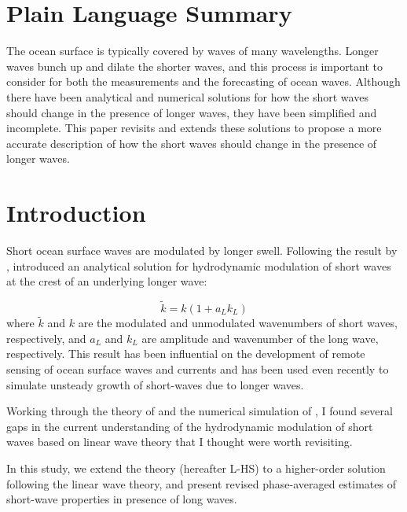 \documentclass[draft]{agujournal2019}
\begin{document}
\section*{Plain Language Summary}
The ocean surface is typically covered by waves of many wavelengths.
Longer waves bunch up and dilate the shorter waves, and this process is
important to consider for both the measurements and the forecasting of ocean
waves.
Although there have been analytical and numerical solutions for how the short
waves should change in the presence of longer waves, they have been simplified
and incomplete.
This paper revisits and extends these solutions to propose a more accurate
description of how the short waves should change in the presence of longer
waves.

\section{Introduction}

Short ocean surface waves are modulated by longer swell.
Following the result by ,
 introduced an analytical solution for hydrodynamic
modulation of short waves at the crest of an underlying longer wave:

\begin{equation}
\label{eq:tau}
\widetilde{k} = k (1 + a_L k_L)
\end{equation}
where $\widetilde{k}$ and $k$ are the modulated and unmodulated wavenumbers of
short waves, respectively, and $a_L$ and $k_L$ are amplitude and wavenumber
of the long wave, respectively.
This result has been influential on the development of remote sensing of ocean
surface waves and currents \cite{keller1975microwave,hara1994hydrodynamic}
and has been used even recently \cite{peureux2021unsteady} to simulate
unsteady growth of short-waves due to longer waves.

Working through the theory of 
and the numerical simulation of , I found several
gaps in the current understanding of the hydrodynamic modulation of short waves
based on linear wave theory that I thought were worth revisiting.

In this study, we extend the  theory (hereafter L-HS)
to a higher-order solution following the linear wave theory, and present revised
phase-averaged estimates of short-wave properties in presence of long waves. 
\end{document}
